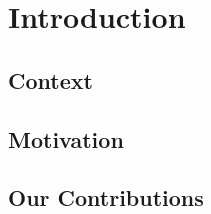 \section{Introduction}
\label{sec:introduction}

\subsection{Context}
\cite{wu_enabling_2015}
\subsection{Motivation}

\subsection{Our Contributions}


